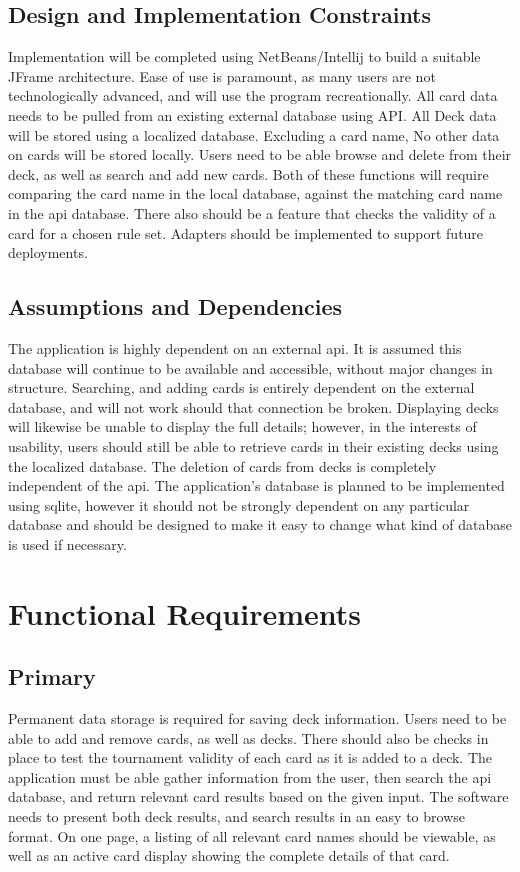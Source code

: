 \documentclass[12pt]{report}
\begin{document}
\section{Design and Implementation Constraints}
Implementation will be completed using NetBeans/Intellij to build a suitable JFrame architecture. Ease of use is paramount, as many users are not technologically advanced, and will use the program recreationally. All card data needs to be pulled from an existing external database using API. All Deck data will be stored using a localized database. Excluding a card name, No other data on cards will be stored locally. Users need to be able browse and delete from their deck, as well as search and add new cards. Both of these functions will require comparing the card name in the local database, against the matching card name in the \acrshort{api} database. There also should be a feature that checks the validity of a card for a chosen rule set.  Adapters should be implemented to support future deployments.
\section{Assumptions and Dependencies}
The application is highly dependent on an external \acrshort{api}. It is assumed this database will continue to be available and accessible, without major changes in structure. Searching, and adding cards is entirely dependent on the external database, and will not work should that connection be broken. Displaying decks will likewise be unable to display the full details; however, in the interests of usability, users should still be able to retrieve cards in their existing decks using the localized database. The deletion of cards from decks is completely independent of the \acrshort{api}. The application's database is planned to be implemented using \gls{sqlite}, however it should not be strongly dependent on any particular database and should be designed to make it easy to change what kind of database is used if necessary.
\chapter{Functional Requirements}
\section{Primary}
Permanent data storage is required for saving deck information. Users need to be able to add and remove cards, as well as decks. There should also be checks in place to test the tournament validity of each card as it is added to a deck. The application must be able gather information from the user, then search the \acrshort{api} database, and return relevant card results based on the given input. The software needs to present both deck results, and search results in an easy to browse format. On one page, a listing of all relevant card names should be viewable, as well as an active card display showing the complete details of that card.
\end{document}

